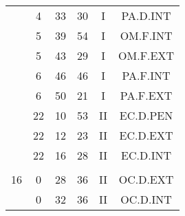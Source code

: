 \documentclass[12pt, a4paper]{article}
\begin{document}
\begin{multicols}{3}
{\begin{tabular}{c c c c c c}
	 	 	 	 & 4 & 33 & 30 & I & PA.D.INT\\%
	 	 	 	 & 5 & 39 & 54 & I & OM.F.INT\\%
	 	 	 	 & 5 & 43 & 29 & I & OM.F.EXT\\%
	 	 	 	 & 6 & 46 & 46 & I & PA.F.INT\\%
	 	 	 	 & 6 & 50 & 21 & I & PA.F.EXT\\%
	 	 	 	 & 22 & 10 & 53 & II & EC.D.PEN\\%
	 	 	 	 & 22 & 12 & 23 & II & EC.D.EXT\\%
	 	 	 	 & 22 & 16 & 28 & II & EC.D.INT\\%
	 	 	 	 & & & & & \\%
	 	 	 	16 & 0 & 28 & 36 & II & OC.D.EXT\\%
	 	 	 	 & 0 & 32 & 36 & II & OC.D.INT\\%
	 	 \end{tabular}
 	}
\end{multicols}
\end{document}
